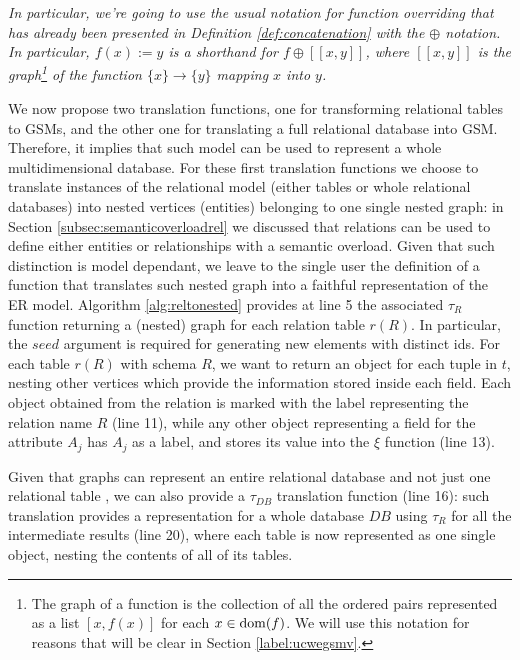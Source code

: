 \textit{\label{def:doublesquarednotation}In particular, we're going to use the usual notation for function overriding \cite{Nielson05} that has already been presented in Definition \vref{def:concatenation} with the $\oplus$ notation. In particular, $f(x):=y$ is a shorthand for $f\oplus [[x, y]]$, where $[[x, y]]$ is the  graph\footnote{The graph of a function is the collection of all the ordered pairs represented as a list $[x,f(x)]$ for each $x\in\operatorname{dom}(f)$. We will use this notation for reasons that will be clear in Section \vref{label:ucwegsmv}.} of the function $\{x\}\to \{y\}$ mapping $x$ into $y$.}



We now propose two translation functions, one for transforming relational tables to GSMs, and the other one for translating a full relational database into GSM. Therefore, it implies that such model can be used to represent a whole multidimensional database. For these first translation functions we choose to translate instances of the relational model (either tables or whole relational databases) into nested vertices (entities) belonging to one single nested graph: in Section \vref{subsec:semanticoverloadrel} we discussed that relations can be used to define either entities or relationships with a semantic overload. Given that such distinction is model dependant, we leave to the single user the definition of a function that translates such nested graph into a faithful representation of the ER model. Algorithm \vref{alg:reltonested} provides at line 5 the associated $\tau_R$ function returning a (nested) graph for each relation table $r(R)$. In particular, the $seed$ argument is required for generating new elements with distinct ids. 
For each table $r(R)$ with schema $R$, we want to return an object for each tuple in $t$, nesting other vertices which provide the information stored inside each field. Each object obtained from the relation is marked with the  label representing  the relation name $R$ (line 11), while any other object representing a field for the attribute $A_j$ has $A_j$ as a label, and stores its value into the $\xi$ function (line 13).  

Given that graphs can represent an entire relational database and
not just one relational table \cite{Fagin83,bergami2014}, we can also provide a $\tau_{DB}$ translation function (line 16): such translation provides a representation for a whole database $DB$ using $\tau_R$ for all the intermediate results (line 20), where each table is now represented as one single object, nesting the contents of all of its tables.


